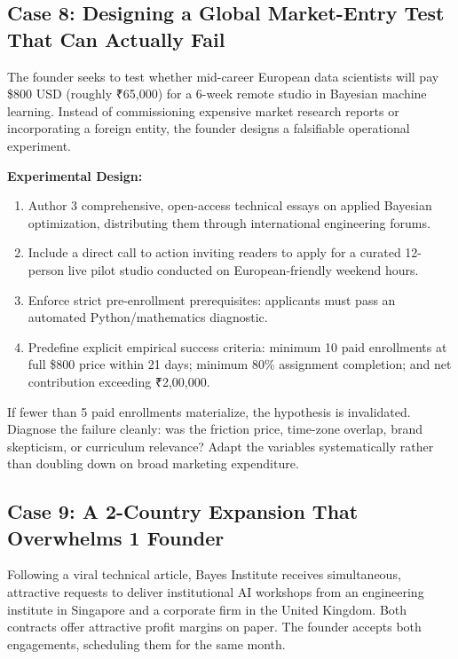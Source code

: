\subsection{Case 8: Designing a Global Market-Entry Test That Can Actually Fail}
\label{sec:case8_test_that_can_fail}

The founder seeks to test whether mid-career European data scientists will pay \$800 USD (roughly ₹65,000) for a 6-week remote studio in Bayesian machine learning. Instead of commissioning expensive market research reports or incorporating a foreign entity, the founder designs a falsifiable operational experiment.

\textbf{Experimental Design:}
\begin{enumerate}
\item Author 3 comprehensive, open-access technical essays on applied Bayesian optimization, distributing them through international engineering forums.
\item Include a direct call to action inviting readers to apply for a curated 12-person live pilot studio conducted on European-friendly weekend hours.
\item Enforce strict pre-enrollment prerequisites: applicants must pass an automated Python/mathematics diagnostic.
\item Predefine explicit empirical success criteria: minimum 10 paid enrollments at full \$800 price within 21 days; minimum 80\% assignment completion; and net contribution exceeding ₹2,00,000.
\end{enumerate}
If fewer than 5 paid enrollments materialize, the hypothesis is invalidated. Diagnose the failure cleanly: was the friction price, time-zone overlap, brand skepticism, or curriculum relevance? Adapt the variables systematically rather than doubling down on broad marketing expenditure.

\subsection{Case 9: A 2-Country Expansion That Overwhelms 1 Founder}
\label{sec:case9_two_country_overwhelm}

Following a viral technical article, Bayes Institute receives simultaneous, attractive requests to deliver institutional AI workshops from an engineering institute in Singapore and a corporate firm in the United Kingdom. Both contracts offer attractive profit margins on paper. The founder accepts both engagements, scheduling them for the same month.

